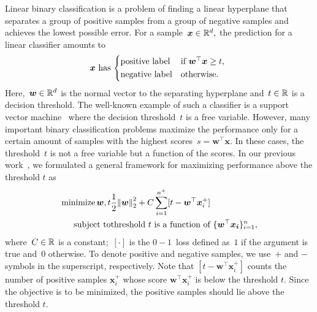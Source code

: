 Linear binary classification is a problem of finding a linear hyperplane that separates a group of positive samples from a group of negative samples and achieves the lowest possible error. For a sample~$\bm{x} \in \mathbb{R}^d,$ the prediction for a linear classifier amounts to
\begin{equation*}
  \bm{x} \textnormal{ has }
  \begin{dcases*}
    \textnormal{positive label} & if~$\bm{w}^{\top} \bm{x} \geq t$, \\
    \textnormal{negative label} & otherwise.
  \end{dcases*}
\end{equation*}
Here,~$\bm{w} \in \mathbb{R}^{d}$ is the normal vector to the separating hyperplane and~$t \in \mathbb{R}$ is a decision threshold. The well-known example of such a classifier is a support vector machine~\cite{cortes1995support} where the decision threshold~$t$ is a free variable. However, many important binary classification problems maximize the performance only for a certain amount of samples with the highest scores~$s = \bm{w}^{\top}\bm{x}.$ In these cases, the threshold~$t$ is not a free variable but a function of the scores. In our previous work~\cite{adam2019patmat}, we formulated a general framework for maximizing performance above the threshold $t$ as
\begin{equation}\label{eq:General problem}
  \begin{aligned}
    \minimize{\bm{w}, t}
    & \frac{1}{2} \norm{\bm{w}}_{2}^{2} + C \sum_{i = 1}^{n^+} [t - \bm{w}^{\top}\bm{x}^+_{i}] \\
    \st
    & \textnormal{threshold} \ t \ \textnormal{is a function of } \{\bm{w}^{\top} \bm{x_i}\}_{i=1}^n,
  \end{aligned}
\end{equation}
where~$C \in \mathbb{R}$ is a constant;~$[\cdot]$ is the $0-1$~loss defined as~$1$ if the argument is true and~$0$ otherwise. To denote positive and negative samples, we use~$+$ and $-$ symbols in the superscript, respectively. Note that $[t - \bm{w}^{\top}\bm{x}^+_{i}]$ counts the number of positive samples $\bm x_i^+$ whose score $\bm{w}^\top \bm x_i^+$ is below the threshold $t$. Since the objective is to be minimized, the positive samples should lie above the threshold $t$.

